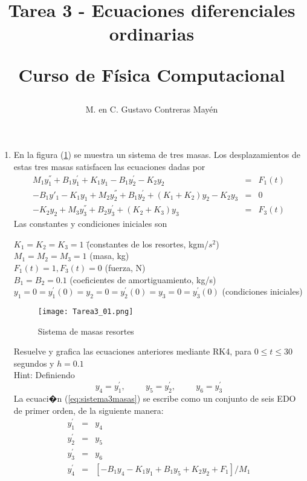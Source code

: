 \documentclass[11pt]{article}
\title{Tarea 3 - Ecuaciones diferenciales ordinarias \\ \begin{large}Curso de F\'{i}sica Computacional\end{large}}
\author{M. en C. Gustavo Contreras May\'{e}n}
\date{ }
\begin{document}
\maketitle
\begin{enumerate}
\item En la figura (\ref{fig:sistemamecanico}) se muestra un sistema de tres masas. Los desplazamientos de estas tres masas satisfacen las ecuaciones dadas por
\begin{eqnarray} 
M_{1} y^{''}_{1} + B_{1}y^{'}_{1}+K_{1}y_{1} - B_{1}y^{'}_{2}-K_{2}y_{2} & = & F_{1}(t) \nonumber \\
-B_{1}y{'}_{1} - K_{1}y_{1} + M_{2}y^{''}_{2} + B_{1}y^{'}_{2} +(K_{1}+K_{2})y_{2} - K_{2}y_{3} & = & 0 \label{eq:sistema3masas} \\
-K_{2}y_{2}+M_{3}y^{''}_{3} + B_{2}y^{'}_{3} + (K_{2}+K_{3})y_{3} & = & F_{3}(t) \nonumber
\end{eqnarray}
Las constantes y condiciones iniciales son
\begin{tabbing}
$K_{1} = K_{2} = K_{3} = 1$ \hspace{5.5cm} \= (constantes de los resortes, kgm/$s^{2}$) \\
$M_{1} = M_{2} = M_{3} = 1$ \> (masa, kg) \\
$F_{1}(t) = 1, F_{3}(t) = 0$ \> (fuerza, N) \\
$B_{1} = B_{2} =0.1$ \> (coeficientes de amortiguamiento, kg/s) \\
$y_{1}=0 = y^{'}_{1}(0) =y_{2}=0 = y^{'}_{2}(0) = y_{3}=0 = y^{'}_{3}(0)$ \> (condiciones iniciales)
\end{tabbing}
\begin{figure}[!h]
	\centering	
	\texttt{[image: Tarea3\_01.png]}
	\label{fig:sistemamecanico}
	\caption{Sistema de masas resortes}
\end{figure}
Resuelve y grafica las ecuaciones anteriores mediante RK4, para $0 \leq t \leq 30$ segundos y $h=0.1$ \\
Hint: Definiendo
\[ y_{4} = y^{'}_{1}, \hspace{1cm} y_{5} = y^{'}_{2}, \hspace{1cm} y_{6} = y^{'}_{3} \]
La ecuaci�n (\ref{eq:sistema3masas}) se escribe como un conjunto de seis EDO de primer orden, de la siguiente manera:
\begin{eqnarray}
y^{'}_{1} & = & y_{4} \\
y^{'}_{2} & = & y_{5} \\
y^{'}_{3} & = & y_{6} \\
y^{'}_{4} & = & \left[ -B_{1}y_{4} - K_{1}y_{1} + B_{1}y_{5} + K_{2}y_{2} + F_{1} \right] / M_{1} \\

\end{eqnarray}
\end{enumerate}
\end{document}
